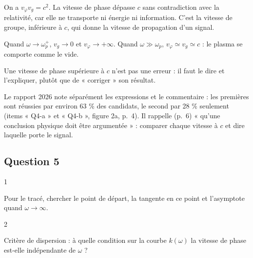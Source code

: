 \documentclass[11pt,a4paper]{article}
\newcommand{\equationajustee}[1]{%
  \sbox{\boiteequation}{$\displaystyle #1$}%
  \ifdim\wd\boiteequation>\linewidth
    \[\resizebox{\linewidth}{!}{\usebox{\boiteequation}}\]%
  \else
    \[#1\]%
  \fi}
\begin{document}
\equationajustee{\boxed{v_\varphi=\frac{c}{\sqrt{1-\omega_p^2/\omega^2}}>c}}

\equationajustee{\boxed{v_g=c\sqrt{1-\frac{\omega_p^2}{\omega^2}}<c}}

On a \(v_\varphi v_g=c^2\). La vitesse de phase dépasse \(c\) sans contradiction avec la relativité, car elle ne transporte ni énergie ni information. C'est la vitesse de groupe, inférieure à \(c\), qui donne la vitesse de propagation d'un signal.

Quand \(\omega\to\omega_p^+\), \(v_g\to0\) et \(v_\varphi\to+\infty\). Quand \(\omega\gg\omega_p\), \(v_\varphi\simeq v_g\simeq c\) : le plasma se comporte comme le vide.

\begin{piege}

Une vitesse de phase supérieure à \(c\) n'est pas une erreur : il faut le dire et l'expliquer, plutôt que de « corriger » son résultat.

\end{piege}

\begin{jury}

Le rapport 2026 note séparément les expressions et le commentaire : les premières sont réussies par environ 63 \% des candidats, le second par 28 \% seulement (items « Q4-a » et « Q4-b », figure 2a, p.~4). Il rappelle (p.~6) « qu'une conclusion physique doit être argumentée » : comparer chaque vitesse à \(c\) et dire laquelle porte le signal.

\end{jury}

\hypertarget{question-5}{%
\subsection{Question 5}\label{question-5}}

\begin{indication}{1}

Pour le tracé, chercher le point de départ, la tangente en ce point et l'asymptote quand \(\omega\to\infty\).

\end{indication}

\begin{indication}{2}

Critère de dispersion : à quelle condition sur la courbe \(k(\omega)\) la vitesse de phase est-elle indépendante de \(\omega\) ?

\end{indication}
\end{document}
